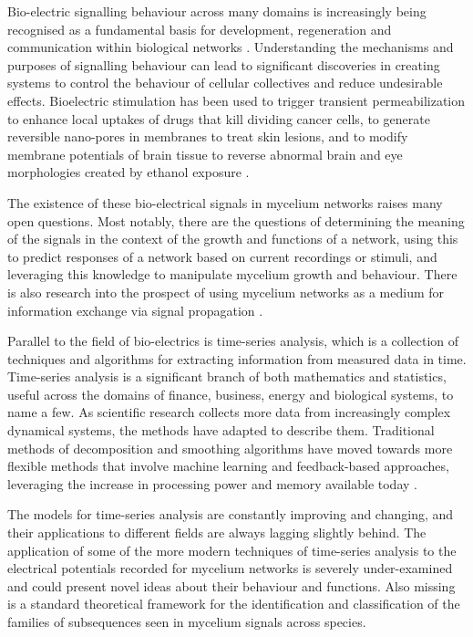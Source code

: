 Bio-electric signalling behaviour across many domains is increasingly being recognised as a fundamental basis for development, regeneration and communication within biological networks \cite{zhang}. Understanding the mechanisms and purposes of signalling behaviour can lead to significant discoveries in creating systems to control the behaviour of cellular collectives and reduce undesirable effects. Bioelectric stimulation has been used to trigger transient permeabilization to enhance local uptakes of drugs that kill dividing cancer cells, to generate reversible nano-pores in membranes to treat skin lesions, and to modify membrane potentials of brain tissue to reverse abnormal brain and eye morphologies created by ethanol exposure \cite{nuccitelli}.

The existence of these bio-electrical signals in mycelium networks raises many open questions. Most notably, there are the questions of determining the meaning of the signals in the context of the growth and functions of a network, using this to predict responses of a network based on current recordings or stimuli, and leveraging this knowledge to manipulate mycelium growth and behaviour. There is also research into the prospect of using mycelium networks as a medium for information exchange via signal propagation \cite{mayne} \cite{phillips}.

Parallel to the field of bio-electrics is time-series analysis, which is a collection of techniques and algorithms for extracting information from measured data in time. Time-series analysis is a significant branch of both mathematics and statistics, useful across the domains of finance, business, energy and biological systems, to name a few. As scientific research collects more data from increasingly complex dynamical systems, the methods have adapted to describe them. Traditional methods of decomposition and smoothing algorithms have moved towards more flexible methods that involve machine learning and feedback-based approaches, leveraging the increase in processing power and memory available today \cite{cabauatan} \cite{gao} \cite{milvus}.

The models for time-series analysis are constantly improving and changing, and their applications to different fields are always lagging slightly behind. The application of some of the more modern techniques of time-series analysis to the electrical potentials recorded for mycelium networks is severely under-examined and could present novel ideas about their behaviour and functions. Also missing is a standard theoretical framework for the identification and classification of the families of subsequences seen in mycelium signals across species.

